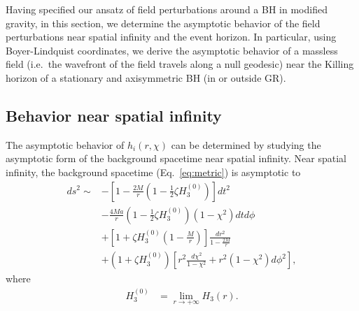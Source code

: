 \documentclass[aps,prx,amsmath,floats,floatfix,twocolumn,
  superscriptaddress,nofootinbib,showpacs]{revtex4-1}
\begin{document}
Having specified our ansatz of field perturbations around a BH in modified gravity, in this section, we determine the asymptotic behavior of the field perturbations near spatial infinity and the event horizon. 
In particular, using Boyer-Lindquist coordinates, we derive the asymptotic behavior of a massless field (i.e.~the wavefront of the field travels along a null geodesic) near the Killing horizon of a stationary and axisymmetric BH (in or outside GR). 

\subsection{Behavior near spatial infinity}

The asymptotic behavior of $h_i(r, \chi)$ can be determined by studying the asymptotic form of the background spacetime near spatial infinity. 
Near spatial infinity, the background spacetime (Eq.~\eqref{eq:metric}) is asymptotic to 
\begin{equation}
\begin{split}
ds^2 \sim & - \left[1-\frac{2M}{r} \left( 1 - \frac{1}{2} \zeta H_3^{(0)} \right) \right] dt^2 \\
& - \frac{4Ma}{r} \left(1 - \frac{1}{2} \zeta H_3^{(0)} \right) (1-\chi^2) dt d \phi \\
& + \left[ 1 + \zeta H_3^{(0)} \left( 1 - \frac{M}{r}\right) \right] \frac{d r^2}{1 - \frac{2M}{r}} \\
& + \left( 1 + \zeta H_3^{(0)} \right) \left[ r^2 \frac{d \chi^2}{1-\chi^2} + r^2 (1-\chi^2) d \phi^2 \right], 
\end{split}
\end{equation}
where 
\begin{equation}
\begin{split}
H_3^{(0)} & = \lim_{r \rightarrow + \infty} H_3 (r). 
\end{split}
\end{equation}
\end{document}
